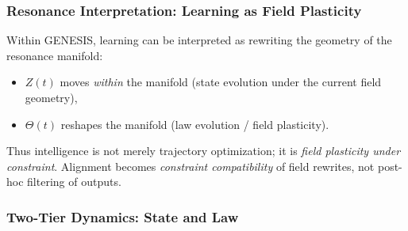 \documentclass[11pt]{article}
\begin{document}
\subsubsection{Resonance Interpretation: Learning as Field Plasticity}
\label{sec:field-plasticity}

Within GENESIS, learning can be interpreted as rewriting the geometry of the resonance manifold:
\begin{itemize}
  \item $Z(t)$ moves \emph{within} the manifold (state evolution under the current field geometry),
  \item $\Theta(t)$ reshapes the manifold (law evolution / field plasticity).
\end{itemize}

Thus intelligence is not merely trajectory optimization; it is \emph{field plasticity under constraint}.
Alignment becomes \emph{constraint compatibility} of field rewrites, not post-hoc filtering of outputs.

\subsubsection{Two-Tier Dynamics: State and Law}
\label{sec:two-tier-dynamics}
\end{document}

